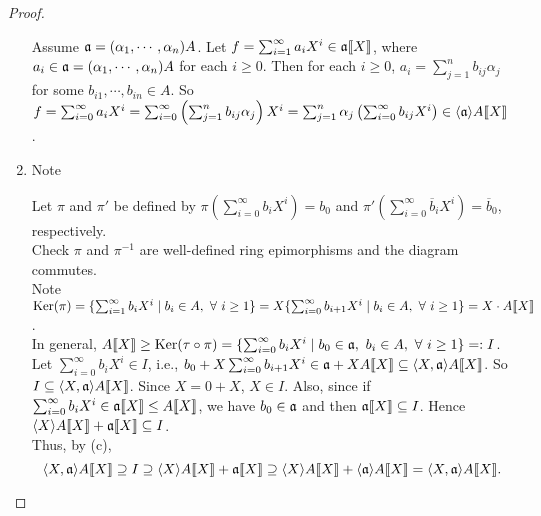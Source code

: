 \begin{proof}
\begin{enumerate}
            Assume $\mathfrak{a} = (\alpha_1,\cdots,\alpha_n)A$. Let $f = \sum_{i=1}^\infty a_iX^i \in \mathfrak{a} \llbracket X \rrbracket$, where $a_i \in \mathfrak{a} = (\alpha_1,\cdots,\alpha_n)A$ for each $i \geq 0$. Then for each $i \geq 0$, $a_i = \sum_{j=1}^n b_{ij}\alpha_j$ for some $b_{i1},\cdots,b_{in} \in A$. So $f = \sum_{i=0}^\infty a_iX^i = \sum_{i=0}^\infty \left(\sum_{j=1}^n b_{ij}\alpha_j\right)X^i = \sum_{j=1}^n \alpha_j \left(\sum_{i=0}^\infty b_{ij}X^i\right) \in \langle \mathfrak{a} \rangle A\llbracket X \rrbracket$.
        \item 
            Note
            \begin{center}
            \end{center}
            Let $\pi$ and $\pi'$ be defined by $\pi(\sum_{i=0}^\infty b_iX^i) = b_0$ and $\pi'(\sum_{i=0}^\infty \overbar b_iX^i) = \overline b_0$, respectively. \\
            Check $\pi$ and $\pi^{-1}$ are well-defined ring epimorphisms and the diagram commutes. \\
            Note $\operatorname{Ker}(\pi) = \{\sum_{i=1}^\infty b_iX^i \mid b_i \in A, \ \forall \  i \geq 1\} = X\{\sum_{i=0}^\infty b_{i+1}X^i \mid b_i \in A, \ \forall \  i \geq 1\} = X \cdot A \llbracket X \rrbracket$.  \\
            In general, $A\llbracket X \rrbracket \geq \ker(\tau \circ \pi) = \{\sum_{i=0}^\infty b_iX^i \mid b_0 \in \ffa,\ b_i \in A, \fa i \geq 1\} =: I$. \\
            Let $\sum_{i=0}^\infty b_i X^i \in I$, i.e., $b_0 + X \sum_{i=0}^\infty b_{i+1}X^i \in \mathfrak{a} + X A\llbracket X \rrbracket \subseteq \langle X,\mathfrak{a} \rangle A\llbracket X \rrbracket$. So $I \subseteq \langle X,\mathfrak{a} \rangle A\llbracket X \rrbracket$. Since $X = 0 + X$, $X \in I$. Also, since if $\sum_{i=0}^\infty b_iX^i \in \mathfrak{a} \llbracket X \rrbracket \leq A \llbracket X \rrbracket$, we have $b_0 \in \mathfrak{a}$ and then $\mathfrak{a} \llbracket X \rrbracket \subseteq I$. Hence $\langle X \rangle A\llbracket X \rrbracket + \mathfrak{a}\llbracket X \rrbracket \subseteq I$. \\
            Thus, by (c),
            \[\langle X,\mathfrak{a} \rangle A\llbracket X \rrbracket \supseteq I \supseteq \langle X \rangle A\llbracket X \rrbracket + \mathfrak{a} \llbracket X \rrbracket \supseteq \langle X \rangle A\llbracket X \rrbracket + \langle \mathfrak{a} \rangle A\llbracket X \rrbracket = \langle X,\mathfrak{a} \rangle A\llbracket X \rrbracket.\] 

\end{enumerate}
\end{proof}
